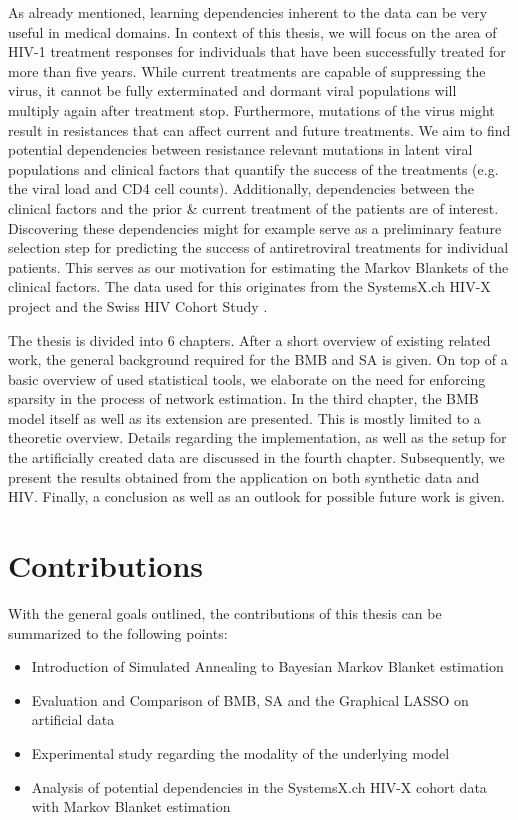 As already mentioned, learning dependencies inherent to the data can be very useful in medical domains.
In context of this thesis, we will focus on the area of HIV-1 treatment responses for individuals that
have been successfully treated for more than five years.
While current treatments are capable of suppressing the virus, it cannot be fully exterminated and dormant viral populations will multiply again after treatment stop. 
Furthermore, mutations of the virus might result in resistances that can affect current and future treatments.
We aim to find potential dependencies between resistance relevant mutations in latent viral populations and clinical factors that quantify the success of the treatments (e.g. the viral load and CD4 cell counts).
Additionally, dependencies between the clinical factors and the prior \& current treatment of the patients are of interest.
Discovering these dependencies might for example serve as a preliminary feature selection step for predicting the success of antiretroviral treatments for individual patients.
This serves as our motivation for estimating the Markov Blankets of the clinical factors.
The data used for this originates from the SystemsX.ch HIV-X project \citep{HIVX} and the Swiss HIV Cohort Study \citep{SHCS}.

The thesis is divided into 6 chapters.
After a short overview of existing related work, the general background required for the \gls{BMB} and \gls{SA} is given.
On top of a basic overview of used statistical tools, we elaborate on the need for enforcing sparsity in the process of network estimation. 
In the third chapter, the \gls{BMB} model itself as well as its extension are presented.
This is mostly limited to a theoretic overview.
Details regarding the implementation, as well as the setup for the artificially created data are discussed in the fourth chapter.
Subsequently, we present the results obtained from the application on both synthetic data and HIV.
Finally, a conclusion as well as an outlook for possible future work is given.

\section{Contributions}
With the general goals outlined, 
the contributions of this thesis can be summarized to the following points:
\begin{itemize}
	\item Introduction of Simulated Annealing to Bayesian Markov Blanket estimation \citep{kaufmann_bayesian_2015}
	\item Evaluation and Comparison of \gls{BMB}, \gls{SA} and the Graphical LASSO on artificial data
	\item Experimental study regarding the modality of the underlying model
	\item Analysis of potential dependencies in the SystemsX.ch HIV-X cohort data \citep{HIVX, SHCS} with Markov Blanket estimation
	
\end{itemize}